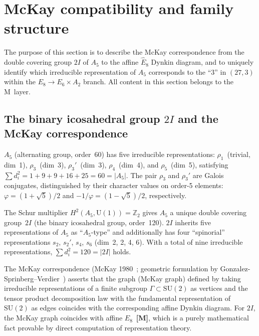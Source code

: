 \documentclass[sn-mathphys-num,Numbered]{sn-jnl}
\theoremstyle{thmstyleone}
\theoremstyle{thmstylethree}
\newcommand{\SU}{\mathrm{SU}}
\newcommand{\U}{\mathrm{U}}
\newcommand{\Ehat}{\hat{E}}
\newcommand{\layerM}{\textbf{[M]}}
\begin{document}
\section{McKay compatibility and family structure}\label{sec:mckay-family}

The purpose of this section is to describe the McKay correspondence from the
double covering group $2I$ of $A_5$ to the affine $\Ehat_8$ Dynkin diagram,
and to uniquely identify which irreducible representation of $A_5$ corresponds
to the ``3'' in $(27,3)$ within the $E_8 \to E_6 \times A_2$ branch.  All
content in this section belongs to the M~layer.


\subsection{The binary icosahedral group $2I$ and the McKay correspondence}\label{sec:mckay}

$A_5$ (alternating group, order~60) has five irreducible representations:
$\rho_1$~(trivial, dim~1), $\rho_3$~(dim~3), $\rho_3'$~(dim~3),
$\rho_4$~(dim~4), and $\rho_5$~(dim~5), satisfying $\sum d_i^2 = 1 + 9 + 9 +
16 + 25 = 60 = |A_5|$.  The pair $\rho_3$ and $\rho_3'$ are Galois
conjugates, distinguished by their character values on order-5 elements:
$\varphi = (1+\sqrt{5})/2$ and $-1/\varphi = (1-\sqrt{5})/2$, respectively.

The Schur multiplier $H^2(A_5, \U(1)) = \mathbb{Z}_2$ gives $A_5$ a unique
double covering group~$2I$ (the binary icosahedral group, order~120).  $2I$
inherits five representations of $A_5$ as ``$A_5$-type'' and additionally has
four ``spinorial'' representations $s_2$, $s_2'$, $s_4$, $s_6$ (dim~2, 2, 4,
6).  With a total of nine irreducible representations, $\sum d_i^2 = 120 =
|2I|$ holds.

The McKay correspondence (McKay 1980~\cite{McKay1980}; geometric formulation
by Gonzalez-Sprinberg--Verdier~\cite{GSV1983}) asserts that the graph (McKay
graph) defined by taking irreducible representations of a finite subgroup
$\Gamma \subset \SU(2)$ as vertices and the tensor product decomposition law
with the fundamental representation of $\SU(2)$ as edges coincides with the
corresponding affine Dynkin diagram.  For $2I$, the McKay graph coincides with
affine $\Ehat_8$~\layerM, which is a purely mathematical fact provable by
direct computation of representation theory.
\end{document}
